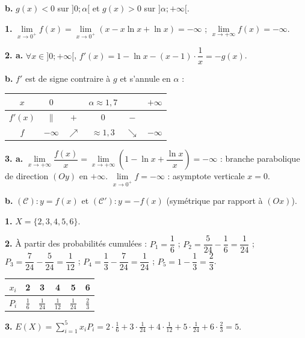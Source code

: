 \documentclass[11pt]{article}
\begin{document}
\textbf{b.} $g(x) < 0$ sur $]0;\alpha[$ et $g(x) > 0$ sur $]\alpha;+\infty[$.

\textbf{1.} $\lim\limits_{x\to 0^+} f(x) = \lim\limits_{x\to 0^+}(x - x\ln x + \ln x) = -\infty$ ; $\lim\limits_{x\to+\infty} f(x) = -\infty$.

\textbf{2. a.} $\forall x \in ]0;+\infty[$, $f'(x) = 1 - \ln x - (x-1)\cdot\dfrac{1}{x} = -g(x)$.

\textbf{b.} $f'$ est de signe contraire à $g$ et s'annule en $\alpha$ :
\begin{center}\renewcommand{\arraystretch}{1.4}
\begin{tabular}{|c|ccccc|}
\hline $x$ & $0$ & & $\alpha\approx 1{,}7$ & & $+\infty$ \\\hline $f'(x)$ & $\|$ & $+$ & $0$ & $-$ & \\\hline $f$ & $-\infty$ & $\nearrow$ & $\approx 1{,}3$ & $\searrow$ & $-\infty$ \\\hline
\end{tabular}
\end{center}

\textbf{3. a.} $\lim\limits_{x\to+\infty}\dfrac{f(x)}{x} = \lim\limits_{x\to+\infty}\left(1 - \ln x + \dfrac{\ln x}{x}\right) = -\infty$ : branche parabolique de direction $(Oy)$ en $+\infty$. $\lim\limits_{x\to 0^+} f = -\infty$ : asymptote verticale $x = 0$.

\textbf{b.} $(\mathcal{C}) : y = f(x)$ et $(\mathcal{C}') : y = -f(x)$ (symétrique par rapport à $(Ox)$).
\begin{center}
\end{center}

\textbf{1.} $X = \{2, 3, 4, 5, 6\}$.

\textbf{2.} À partir des probabilités cumulées : $P_1 = \dfrac{1}{6}$ ; $P_2 = \dfrac{5}{24} - \dfrac{1}{6} = \dfrac{1}{24}$ ; $P_3 = \dfrac{7}{24} - \dfrac{5}{24} = \dfrac{1}{12}$ ; $P_4 = \dfrac{1}{3} - \dfrac{7}{24} = \dfrac{1}{24}$ ; $P_5 = 1 - \dfrac{1}{3} = \dfrac{2}{3}$.
\begin{center}\renewcommand{\arraystretch}{1.5}
\begin{tabular}{|c|c|c|c|c|c|}
\hline $x_i$ & 2 & 3 & 4 & 5 & 6 \\\hline $P_i$ & $\frac{1}{6}$ & $\frac{1}{24}$ & $\frac{1}{12}$ & $\frac{1}{24}$ & $\frac{2}{3}$ \\\hline
\end{tabular}
\end{center}

\textbf{3.} $E(X) = \displaystyle\sum_{i=1}^5 x_i P_i = 2\cdot\tfrac{1}{6} + 3\cdot\tfrac{1}{24} + 4\cdot\tfrac{1}{12} + 5\cdot\tfrac{1}{24} + 6\cdot\tfrac{2}{3} = 5$.
\end{document}

